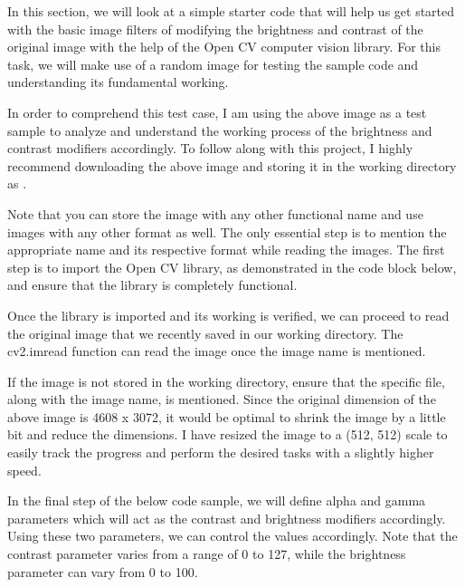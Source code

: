 In this section, we will look at a simple starter code that will help us get started with the basic image filters of modifying the brightness and contrast of the original image with the help of the Open CV computer vision library. For this task, we will make use of a random image for testing the sample code and understanding its fundamental working.

In order to comprehend this test case, I am using the above image as a test sample to analyze and understand the working process of the brightness and contrast modifiers accordingly. To follow along with this project, I highly recommend downloading the above image and storing it in the working directory as .

Note that you can store the image with any other functional name and use images with any other format as well. The only essential step is to mention the appropriate name and its respective format while reading the images. The first step is to import the Open CV library, as demonstrated in the code block below, and ensure that the library is completely functional.

\medskip



\medskip

Once the library is imported and its working is verified, we can proceed to read the original image that we recently saved in our working directory. The cv2.imread function can read the image once the image name is mentioned.

If the image is not stored in the working directory, ensure that the specific file, along with the image name, is mentioned. Since the original dimension of the above image is 4608 x 3072, it would be optimal to shrink the image by a little bit and reduce the dimensions. I have resized the image to a (512, 512) scale to easily track the progress and perform the desired tasks with a slightly higher speed.

In the final step of the below code sample, we will define alpha and gamma parameters which will act as the contrast and brightness modifiers accordingly. Using these two parameters, we can control the values accordingly. Note that the contrast parameter varies from a range of 0 to 127, while the brightness parameter can vary from 0 to 100.

\medskip


